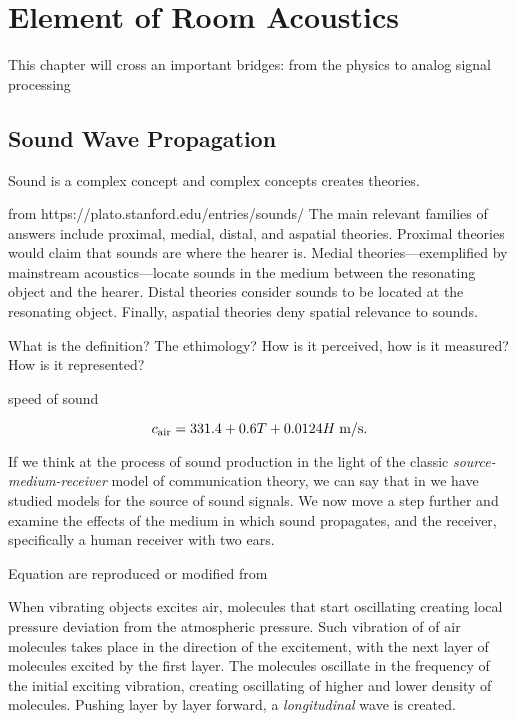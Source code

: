 \chapter{Element of Room Acoustics}\label{chap:acoustics}

 This chapter will cross an important bridges: from the physics to analog signal processing

\section{Sound Wave Propagation}

Sound is a complex concept and complex concepts creates theories.


from https://plato.stanford.edu/entries/sounds/
The main relevant families of answers include proximal, medial, distal, and aspatial theories.
Proximal theories would claim that sounds are where the hearer is.
Medial theories—exemplified by mainstream acoustics—locate sounds in the medium between the resonating object and the hearer.
Distal theories consider sounds to be located at the resonating object. Finally, aspatial theories deny spatial relevance to sounds.

What is the definition? The ethimology?
How is it perceived, how is it measured? How is it represented?

speed of sound

\begin{equation}
    c_\text{air} =  331.4 + 0.6T + 0.0124H \; \text{m/s}
    .
\end{equation}


If we think at the process of sound production in the light of the classic \textit{source-medium-receiver} model of communication theory,
we can say that in we have studied models for the source of sound signals. We now move a step further and examine the effects of the medium in which sound propagates, and the receiver, specifically a human receiver with two ears.

Equation are reproduced or modified from \cite{Kuttruff2009room, Marczuk2006modelling, Habets2010generator, Avanzini2019Chapter4, Allen1999image}

When vibrating objects excites air, molecules that start oscillating creating local pressure deviation from the atmospheric pressure.
Such vibration of of air molecules takes place in the direction of the excitement, with the next layer of molecules excited by the first layer.
The molecules oscillate in the frequency of the initial exciting vibration, creating oscillating of higher and lower density of molecules.
Pushing layer by layer forward, a \textit{longitudinal} wave is created.

